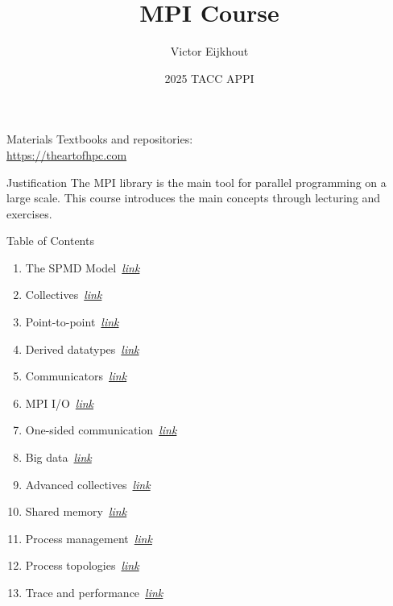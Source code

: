 \documentclass[10pt]{beamer}
\begin{document}
\author[Eijkhout]{Victor Eijkhout}
\date[2025]{2025 TACC APPI}
\title[MPI]{MPI Course}
\maketitle

\begin{frame}[containsverbatim]{Materials}
    Textbooks and repositories:\\
    \url{https://theartofhpc.com}
\end{frame}

\begin{frame}{Justification}
  The MPI library is the main tool
  for parallel programming on a large scale.
  This course introduces the main concepts
  through lecturing and exercises.
\end{frame}

\begin{frame}{Table of Contents}
  \begin{enumerate}
  \item The SPMD Model~\hyperlink{sec:spmd}{\textsl{link}}
  \item Collectives~\hyperlink{sec:collectives}{\textsl{link}}
  \item Point-to-point~\hyperlink{sec:ptp}{\textsl{link}}
  \item Derived datatypes~\hyperlink{sec:derived}{\textsl{link}}
  \item Communicators~\hyperlink{sec:comm}{\textsl{link}}
  \item MPI I/O~\hyperlink{sec:io}{\textsl{link}}
  \item One-sided communication~\hyperlink{sec:1side}{\textsl{link}}
  \item Big data~\hyperlink{sec:bigdata}{\textsl{link}}
  \item Advanced collectives~\hyperlink{sec:coll2}{\textsl{link}}
  \item Shared memory~\hyperlink{sec:shared}{\textsl{link}}
  \item Process management~\hyperlink{sec:process}{\textsl{link}}
  \item Process topologies~\hyperlink{sec:topo}{\textsl{link}}
  \item Trace and performance~\hyperlink{sec:trace}{\textsl{link}}
  \end{enumerate}
\end{frame}

\end{document}
